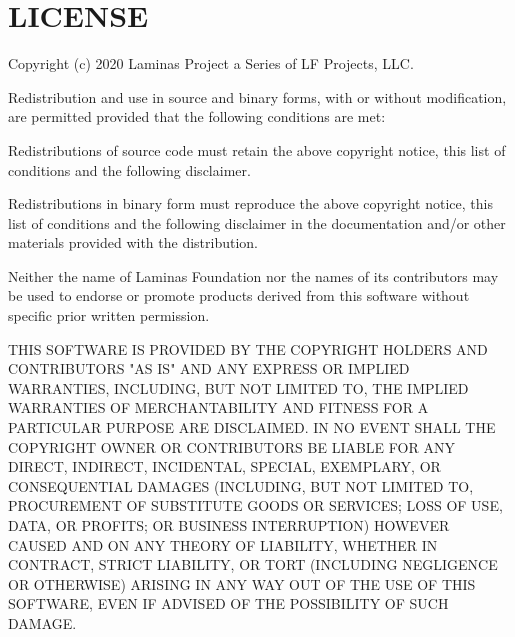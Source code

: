 \chapter{LICENSE}
\hypertarget{md_system_2_third_party_2_escaper_2_l_i_c_e_n_s_e}{}\label{md_system_2_third_party_2_escaper_2_l_i_c_e_n_s_e}
Copyright (c) 2020 Laminas Project a Series of LF Projects, LLC.

Redistribution and use in source and binary forms, with or without modification, are permitted provided that the following conditions are met\+:


\begin{DoxyItemize}
\item Redistributions of source code must retain the above copyright notice, this list of conditions and the following disclaimer.
\item Redistributions in binary form must reproduce the above copyright notice, this list of conditions and the following disclaimer in the documentation and/or other materials provided with the distribution.
\item Neither the name of Laminas Foundation nor the names of its contributors may be used to endorse or promote products derived from this software without specific prior written permission.
\end{DoxyItemize}

THIS SOFTWARE IS PROVIDED BY THE COPYRIGHT HOLDERS AND CONTRIBUTORS "{}\+AS IS"{} AND ANY EXPRESS OR IMPLIED WARRANTIES, INCLUDING, BUT NOT LIMITED TO, THE IMPLIED WARRANTIES OF MERCHANTABILITY AND FITNESS FOR A PARTICULAR PURPOSE ARE DISCLAIMED. IN NO EVENT SHALL THE COPYRIGHT OWNER OR CONTRIBUTORS BE LIABLE FOR ANY DIRECT, INDIRECT, INCIDENTAL, SPECIAL, EXEMPLARY, OR CONSEQUENTIAL DAMAGES (INCLUDING, BUT NOT LIMITED TO, PROCUREMENT OF SUBSTITUTE GOODS OR SERVICES; LOSS OF USE, DATA, OR PROFITS; OR BUSINESS INTERRUPTION) HOWEVER CAUSED AND ON ANY THEORY OF LIABILITY, WHETHER IN CONTRACT, STRICT LIABILITY, OR TORT (INCLUDING NEGLIGENCE OR OTHERWISE) ARISING IN ANY WAY OUT OF THE USE OF THIS SOFTWARE, EVEN IF ADVISED OF THE POSSIBILITY OF SUCH DAMAGE. 